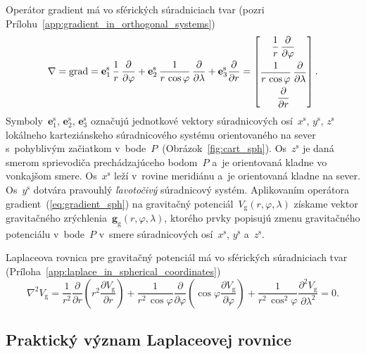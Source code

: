 \documentclass[a4paper,12pt]{book}
\newcommand{\grad}{\mathrm{grad}}
\newcommand{\gidx}{\mathrm g}
\let\vec\mathbf
\begin{document}
Operátor gradient má vo sférických súradniciach tvar (pozri 
Prílohu~\ref{app:gradient_in_orthogonal_systems})
%
\begin{equation}
\label{eq:gradient_sph}
\nabla = \grad = \vec e_1^\mathrm{s} \, \frac{1}{r} \, \frac{\partial}{\partial 
\varphi} + \vec e_2^\mathrm{s} \, \frac{1}{r \, \cos\varphi} \, 
\frac{\partial}{\partial \lambda} + \vec e_3^\mathrm{s} 
\frac{\partial}{\partial r}\\
%
=
%
\begin{bmatrix}
\dfrac{1}{r} \, \dfrac{\partial}{\partial \varphi} \\[2ex]
\dfrac{1}{r \, \cos\varphi} \, \dfrac{\partial}{\partial \lambda}\\[2ex]
\dfrac{\partial}{\partial r}
\end{bmatrix}
{.}
\end{equation}
%
Symboly~$\vec{e}_1^\mathrm{s}$, $\vec{e}_2^{\mathrm{s}}$, 
$\vec{e}_3^\mathrm{s}$ označujú jednotkové vektory súradnicových 
osí~$x^\mathrm{s}$, $y^\mathrm{s}$, $z^\mathrm{s}$ lokálneho karteziánskeho 
súradnicového systému orientovaného na sever s~pohyblivým začiatkom 
v~bode~$P$~(Obrázok~\ref{fig:cart_sph}).  Os~$z^\mathrm{s}$ je daná smerom 
sprievodiča prechádzajúceho bodom~$P$ a~je orientovaná kladne vo vonkajšom 
smere.  Os~$x^\mathrm{s}$ leží v~rovine meridiánu a~je orientovaná kladne na 
sever.  Os~$y^\mathrm{s}$ dotvára pravouhlý \emph{ľavotočivý} súradnicový 
systém.  Aplikovaním operátora gradient~(\ref{eq:gradient_sph}) na gravitačný 
potenciál~$V_\gidx(r, \varphi, \lambda)$ získame vektor gravitačného 
zrýchlenia~$\vec g_\gidx(r, \varphi, \lambda)$, ktorého prvky popisujú zmenu 
gravitačného potenciálu v~bode~$P$ v~smere súradnicových osí~$x^\mathrm{s}$, 
$y^\mathrm{s}$ a~$z^\mathrm{s}$.

Laplaceova rovnica pre gravitačný potenciál má vo sférických súradniciach tvar 
(Príloha~\ref{app:laplace_in_spherical_coordinates})
%
\begin{equation}
\label{eq:vg_laplace_sph}
\nabla^2 V_\gidx = \frac{1}{r^2} \frac{\partial}{\partial r} \left( r^2
\frac{\partial V_\gidx}{\partial r} \right) + \frac{1}{r^2 \, \cos\varphi}
\frac{\partial}{\partial \varphi} \left( \cos\varphi \frac{\partial
V_\gidx}{\partial \varphi} \right) + \frac{1}{r^2 \,
\cos^2\varphi}\frac{\partial^2 V_\gidx}{\partial \lambda^2} = 0{.}
\end{equation}


\subsection{Praktický význam Laplaceovej rovnice}
\label{sec:meaning_of_laplace_equation_in_practice}
\end{document}
